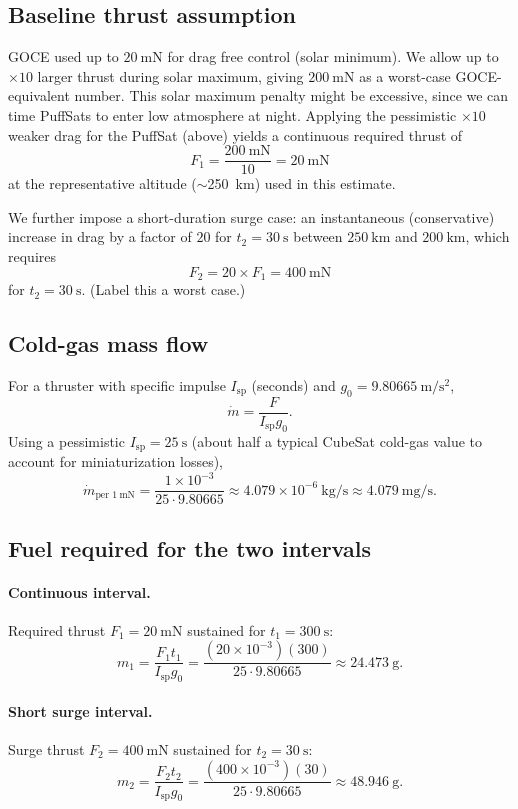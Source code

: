 \documentclass{article}
\begin{document}
\subsection*{Baseline thrust assumption}
GOCE used up to \(\SI{20}{\milli\newton}\) for drag free control (solar minimum).  We  allow up to \(\times 10\) larger thrust during solar maximum, giving \(\SI{200}{\milli\newton}\) as a worst-case GOCE-equivalent number.  This solar maximum penalty might be excessive, since we can time PuffSats to enter low atmosphere at night.  Applying the pessimistic \(\times 10\) weaker drag for the PuffSat (above) yields a continuous required thrust of
\[
F_1 = \frac{\SI{200}{\milli\newton}}{10} = \SI{20}{\milli\newton}
\]
at the representative altitude (\(\sim\)\SI{250}{\kilo\metre}) used in this estimate. 

We further impose a short-duration surge case: an instantaneous (conservative) increase in drag by a factor of \(20\) for \(t_2=\SI{30}{\s}\) between \(\SI{250}{\kilo\metre}\) and \(\SI{200}{\kilo\metre}\), which requires
\[
F_2 = 20\times F_1 = \SI{400}{\milli\newton}
\]
for \(t_2=\SI{30}{\s}\).  (Label this a worst case.)

\subsection*{Cold-gas mass flow}
For a thruster with specific impulse \(I_{\mathrm{sp}}\) (seconds) and \(g_0=\SI{9.80665}{\m\per\s^2}\),
\[
\dot m = \frac{F}{I_{\mathrm{sp}} g_0}.
\]
Using a pessimistic \(I_{\mathrm{sp}}=\SI{25}{\s}\) (about half a typical CubeSat cold-gas value to account for miniaturization losses),
\[
\dot m_{\text{per }1\ \mathrm{mN}} = \frac{1\times 10^{-3}}{25\cdot 9.80665}
\approx 4.079\times 10^{-6}\ \mathrm{kg/s} \approx 4.079\ \mathrm{mg/s}.
\]

\subsection*{Fuel required for the two intervals}
\paragraph{Continuous interval.}
Required thrust \(F_1=\SI{20}{\milli\newton}\) sustained for \(t_1=\SI{300}{\s}\):
\[
m_1 = \frac{F_1 t_1}{I_{\mathrm{sp}} g_0}
= \frac{(20\times 10^{-3})(300)}{25\cdot 9.80665}
\approx \SI{24.473}{\g}.
\]

\paragraph{Short surge interval.}
Surge thrust \(F_2=\SI{400}{\milli\newton}\) sustained for \(t_2=\SI{30}{\s}\):
\[
m_2 = \frac{F_2 t_2}{I_{\mathrm{sp}} g_0}
= \frac{(400\times 10^{-3})(30)}{25\cdot 9.80665}
\approx \SI{48.946}{\g}.
\]
\end{document}
